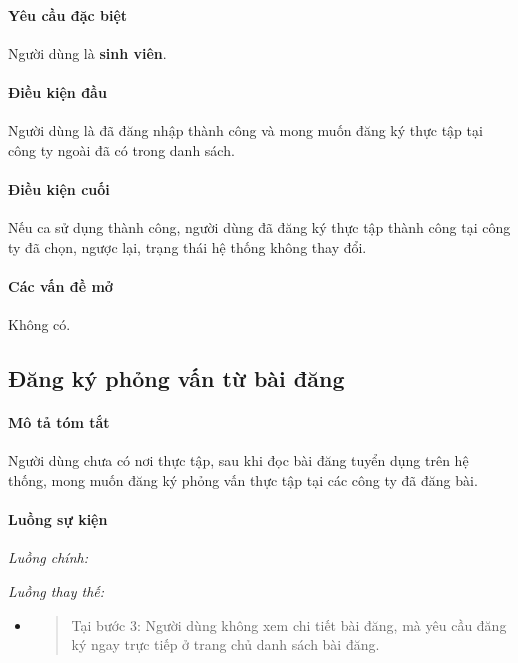 \documentclass[./../main.tex]{subfiles}
\begin{document}
\paragraph*{Yêu cầu đặc biệt}

Người dùng là \textbf{sinh viên}.

\paragraph*{Điều kiện đầu}

Người dùng là đã đăng nhập thành công và mong muốn đăng ký thực tập tại
công ty ngoài đã có trong danh sách.

\paragraph*{Điều kiện cuối}

Nếu ca sử dụng thành công, người dùng đã đăng ký thực tập thành công tại
công ty đã chọn, ngược lại, trạng thái hệ thống không thay đổi.

\paragraph*{Các vấn đề mở}

Không có.

\subsection{Đăng ký phỏng vấn từ bài đăng}

\paragraph*{Mô tả tóm tắt}

Người dùng chưa có nơi thực tập, sau khi đọc bài đăng tuyển dụng trên hệ
thống, mong muốn đăng ký phỏng vấn thực tập tại các công ty đã đăng bài.

\paragraph*{Luồng sự kiện}

\emph{Luồng chính:}

\emph{Luồng thay thế:}

\begin{itemize}
\item
  \begin{quote}
  Tại bước 3: Người dùng không xem chi tiết bài đăng, mà yêu cầu đăng ký
  ngay trực tiếp ở trang chủ danh sách bài đăng.
  \end{quote}
\end{itemize}
\end{document}
